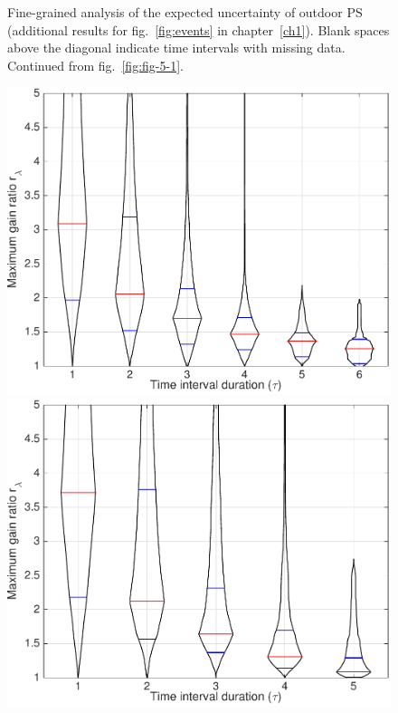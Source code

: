 \begin{figure}
\begin{minipage}[c]{\mylength}
\end{minipage}
\vspace{1em}
\caption[Fine-grained analysis of the expected uncertainty of outdoor PS (cont.)]{Fine-grained analysis of the expected uncertainty of outdoor PS (additional results for fig.~\ref{fig:events} in chapter~\ref{ch1}). Blank spaces above the diagonal indicate time intervals with missing data. Continued from fig.~\ref{fig:fig-5-1}.}
\label{fig:fig-5-2}
\end{figure}

\begin{figure}
\centering
\includegraphics[width=\mylength]{dist/20130711-maxGain-local-relativePerf}
\includegraphics[width=\mylength]{dist/20130816-maxGain-local-relativePerf}

\end{figure}
